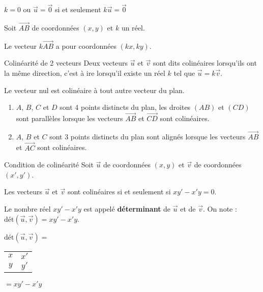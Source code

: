 \begin{Rq}
$k=0$ ou $\vec{u}=\vec{0}$ si et seulement $k\vec{u}=\vec{0}$
\end{Rq}


\begin{Th}
Soit $\overrightarrow{AB}$ de coordonnées $(x,y)$ et $k$ un réel.

Le vecteur  $k\overrightarrow{AB}$ a pour coordonnées $(kx,ky)$.
\end{Th}





















\begin{DefT}{Colinéarité de 2 vecteurs}
Deux vecteurs $\overrightarrow{u}$ et $\overrightarrow{v}$ sont dits colinéaires lorsqu'ils ont la même direction, c'est à ire lorsqu'il existe un réel $k$ tel que $\overrightarrow{u}=k\overrightarrow{v}$.
\end{DefT}



\begin{Rq}
Le vecteur nul est colinéaire à tout autre vecteur du plan.
\end{Rq}


\begin{Th}
\begin{enumerate}
\item $A$, $B$, $C$ et $D$ sont 4 points distincts du plan, les droites $(AB)$ et $(CD)$ sont parallèles lorsque les vecteurs $\overrightarrow{AB}$ et $\overrightarrow{CD}$ sont colinéaires.
\item $A$, $B$ et $C$ sont 3 points distincts du plan  sont alignés lorsque les vecteurs $\overrightarrow{AB}$ et $\overrightarrow{AC}$ sont colinéaires.
\end{enumerate}
\end{Th}

\begin{ThT}{Condition de colinéarité}
Soit $\overrightarrow{u}$ de coordonnées $(x,y)$ et $\overrightarrow{v}$ de coordonnées $(x',y')$.

Les vecteurs  $\overrightarrow{u}$ et $\overrightarrow{v}$ sont colinéaires si et seulement si $xy'-x'y=0$.

Le nombre réel $xy'-x'y$ est appelé \textbf{déterminant} de $\overrightarrow{u}$ et de $\overrightarrow{v}$. On note : $\text{dét}\left(\overrightarrow{u},\overrightarrow{v}\right)= xy'-x'y$.
\end{ThT}

\begin{Nt}
$\text{dét}\left(\overrightarrow{u},\overrightarrow{v}\right)=$ \begin{tabular}{|cc|}
$x$ & $x'$ \\  
$y$ & $y'$ \\ 
\end{tabular} $=xy'-x'y$
\end{Nt}

 